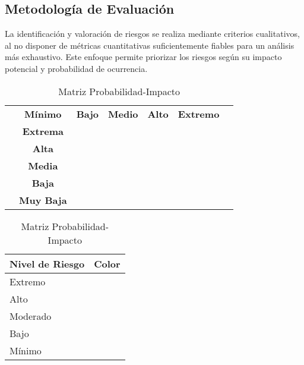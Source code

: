 \subsection*{Metodología de Evaluación}
La identificación y valoración de riesgos se realiza mediante criterios cualitativos, al no disponer de métricas cuantitativas suficientemente fiables para un análisis más exhaustivo. Este enfoque permite priorizar los riesgos según su impacto potencial y probabilidad de ocurrencia.

\begin{table}[H]
\centering
\begin{tabular}{|>{\hsize=1.1\hsize}c|>{\hsize=1.1\hsize}c|c|c|c|c|c|}
\hline
\rowcolor{gray!25}
\multicolumn{2}{|c|}{\multirow{2}{*}{}} & \multicolumn{5}{c|}{\textbf{Impacto}} \\
\cline{3-7}
\multicolumn{2}{|c|}{} & \textbf{Mínimo} & \textbf{Bajo} & \textbf{Medio} & \textbf{Alto} & \textbf{Extremo} \\ \hline

\multirow{6}{*}{\rotatebox{90}{\textbf{Probabilidad}}} 
& \textbf{Extrema} & \cellcolor{greenrisk} & \cellcolor{yellowrisk} & \cellcolor{orangerisk} & \cellcolor{redrisk} & \cellcolor{redrisk} \\ \cline{2-7}
& \textbf{Alta} & \cellcolor{greenrisk} & \cellcolor{greenrisk} & \cellcolor{yellowrisk} & \cellcolor{orangerisk} & \cellcolor{redrisk} \\ \cline{2-7}
& \textbf{Media} & \cellcolor{bluerisk} & \cellcolor{greenrisk} & \cellcolor{greenrisk} & \cellcolor{yellowrisk} & \cellcolor{orangerisk} \\ \cline{2-7}
& \textbf{Baja} & \cellcolor{bluerisk} & \cellcolor{bluerisk} & \cellcolor{greenrisk} & \cellcolor{greenrisk} & \cellcolor{yellowrisk} \\ \cline{2-7}
& \textbf{Muy Baja} & \cellcolor{bluerisk} & \cellcolor{bluerisk} & \cellcolor{bluerisk} & \cellcolor{greenrisk} & \cellcolor{greenrisk} \\ \hline
\end{tabular}

\vspace{5mm}

\begin{tabular}{|l|l|}
\hline
\rowcolor{gray!25}
\textbf{Nivel de Riesgo} & \textbf{Color} \\ \hline
Extremo & \cellcolor{redrisk} \\ \hline
Alto & \cellcolor{orangerisk} \\ \hline
Moderado & \cellcolor{yellowrisk} \\ \hline
Bajo & \cellcolor{greenrisk} \\ \hline
Mínimo & \cellcolor{bluerisk} \\ \hline
\end{tabular}
\label{tab:matriz_pi}
\caption{Matriz Probabilidad-Impacto}
\end{table}

